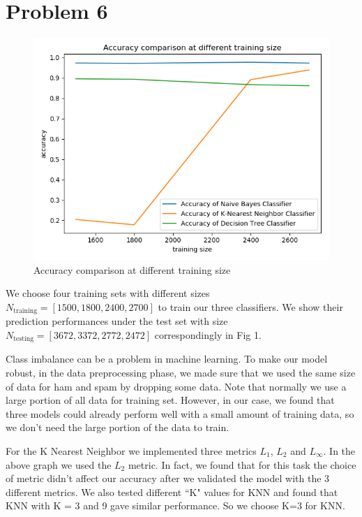 \documentclass[twoside,11pt]{homework}
\begin{document}
\newpage
\section*{Problem 6}
\begin{figure}[h]
    \includegraphics[width=\textwidth]{accuracy_graph.png}
    \caption{Accuracy comparison at different training size}
\end{figure}


We choose four training sets with different sizes $N_\mathrm{training} = [1500, 1800, 2400, 2700]$ to train our three classifiers. We show their prediction performances under the test set with size $N_\mathrm{testing} = [3672, 3372, 2772, 2472]$ correspondingly in Fig 1.

Class imbalance can be a problem in machine learning. To make our model robust, in the data preprocessing phase, we made sure that we used the same size of data for ham and spam by dropping some data. Note that normally we use a large portion of all data for training set. However, in our case, we found that three models could already perform well with a small amount of training data, so we don't need the large portion of the data to train. 

For the K Nearest Neighbor we implemented three metrics $L_{1}$, $L_{2}$ and $L_{\infty}$. In the above graph we used the $L_{2}$ metric. In fact, we found that for this task the choice of metric didn't affect our accuracy after we validated the model with the 3 different metrics. 
We also tested different ``K" values for KNN and found that KNN with K = 3 and 9 gave similar performance.
So we choose K=3 for KNN. 
\end{document}
